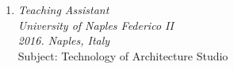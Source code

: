 \begin{enumerate}[leftmargin=0.45cm, itemsep=0.4em, topsep=0.5em, parsep=0.2em]
    \item
    \emph{Teaching Assistant} \\
    \emph{University of Naples Federico II} \\
    \textit{2016. Naples, Italy} \\
    Subject: Technology of Architecture Studio
\end{enumerate}